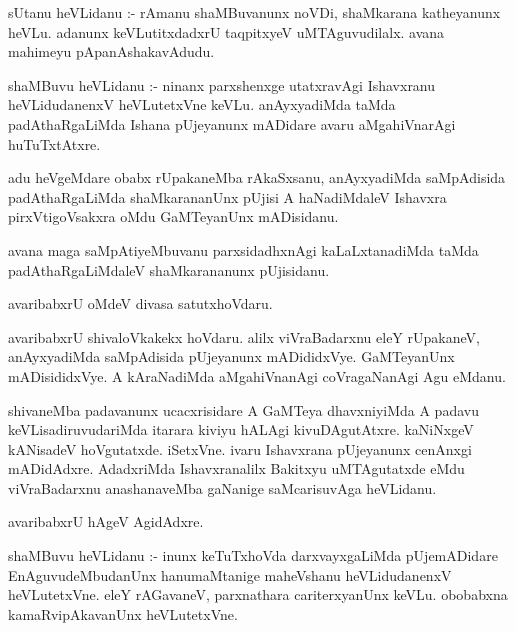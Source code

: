 \documentclass{article}
\begin{document}
\begin{mn}
sUtanu  heVLidanu :- rAmanu  shaMBuvanunx  noVDi,  shaMkarana  katheyanunx  heVLu.  adanunx  keVLutitxdadxrU  taqpitxyeV  uMTAguvudilalx.  
avana  mahimeyu  pApanAshakavAdudu.
\end{mn}

\begin{mn}
shaMBuvu  heVLidanu :- ninanx  parxshenxge  utatxravAgi  Ishavxranu  heVLidudanenxV  heVLutetxVne  keVLu.  anAyxyadiMda  taMda  padAthaRgaLiMda  
Ishana  pUjeyanunx  mADidare  avaru  aMgahiVnarAgi  huTuTxtAtxre.
\end{mn}

\begin{mn}
adu  heVgeMdare  obabx  rUpakaneMba  rAkaSxsanu,  anAyxyadiMda  saMpAdisida  padAthaRgaLiMda  shaMkarananUnx  pUjisi  A  haNadiMdaleV  
Ishavxra  pirxVtigoVsakxra  oMdu  GaMTeyanUnx  mADisidanu.
\end{mn}

\begin{mn}
avana  maga  saMpAtiyeMbuvanu  parxsidadhxnAgi  kaLaLxtanadiMda  taMda  padAthaRgaLiMdaleV  shaMkarananunx  pUjisidanu.
\end{mn}

\begin{mn}
avaribabxrU  oMdeV  divasa  satutxhoVdaru.
\end{mn}

\begin{mn}
avaribabxrU  shivaloVkakekx  hoVdaru.  alilx  viVraBadarxnu  eleY  rUpakaneV,  anAyxyadiMda  saMpAdisida  pUjeyanunx  mADididxVye.  
GaMTeyanUnx  mADisididxVye.  A  kAraNadiMda  aMgahiVnanAgi  coVragaNanAgi  Agu  eMdanu.
\end{mn}

\begin{mn}
shivaneMba  padavanunx  ucacxrisidare  A  GaMTeya  dhavxniyiMda  A  padavu  keVLisadiruvudariMda  itarara  kiviyu  hALAgi  kivuDAgutAtxre.  
kaNiNxgeV  kANisadeV  hoVgutatxde.  iSetxVne.  ivaru  Ishavxrana  pUjeyanunx  cenAnxgi  mADidAdxre.  AdadxriMda  Ishavxranalilx  Bakitxyu  
uMTAgutatxde  eMdu  viVraBadarxnu  anashanaveMba  gaNanige  saMcarisuvAga  heVLidanu.
\end{mn}

\begin{mn}
avaribabxrU  hAgeV  AgidAdxre. 
\end{mn}

\begin{mn}
shaMBuvu  heVLidanu :- inunx  keTuTxhoVda  darxvayxgaLiMda  pUjemADidare  EnAguvudeMbudanUnx  hanumaMtanige  maheVshanu  heVLidudanenxV  
heVLutetxVne.  eleY  rAGavaneV,  parxnathara  cariterxyanUnx  keVLu.  obobabxna  kamaRvipAkavanUnx  heVLutetxVne.
\end{mn}
\end{document}
